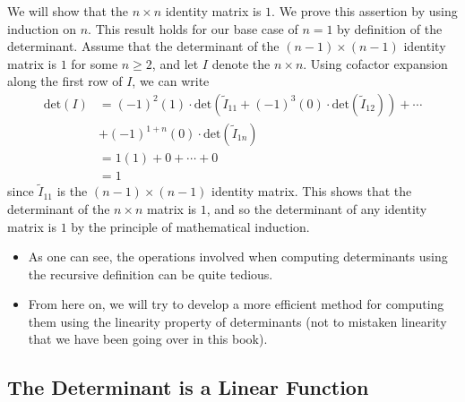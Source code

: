 \begin{eg}
    We will show that the \( n \times n  \) identity matrix is \( 1  \). We prove this assertion by using induction on \( n  \). This result holds for our base case of \( n = 1  \) by definition of the determinant. Assume that the determinant of the \( (n-1) \times (n-1) \) identity matrix is \( 1  \) for some \( n \geq 2  \), and let \( I  \) denote the \( n \times n \). Using cofactor expansion along the first row of \( I  \), we can write
    \begin{align*}
        \text{det}(I) &= (-1)^{2} (1) \cdot \text{det}({\tilde{I}}_{11} + (-1)^{3} (0) \cdot \text{det}({\tilde{I}}_{12})) + \cdots  \\
                      &+ (-1)^{1+n}(0) \cdot \text{det}({\tilde{I}}_{1n}) \\
                      &= 1(1) + 0 + \cdots + 0 \\
                      &= 1
    \end{align*}
    since \( {\tilde{I}}_{11} \) is the \( (n-1) \times (n-1) \) identity matrix. This shows that the determinant of the \( n \times n  \) matrix is \( 1  \), and so the determinant of any identity matrix is \( 1  \) by the principle of mathematical induction.
\end{eg}

\begin{itemize}
    \item As one can see, the operations involved when computing determinants using the recursive definition can be quite tedious.
    \item From here on, we will try to develop a more efficient method for computing them using the linearity property of determinants (not to mistaken linearity that we have been going over in this book).
\end{itemize}

\subsection{The Determinant is a Linear Function}


